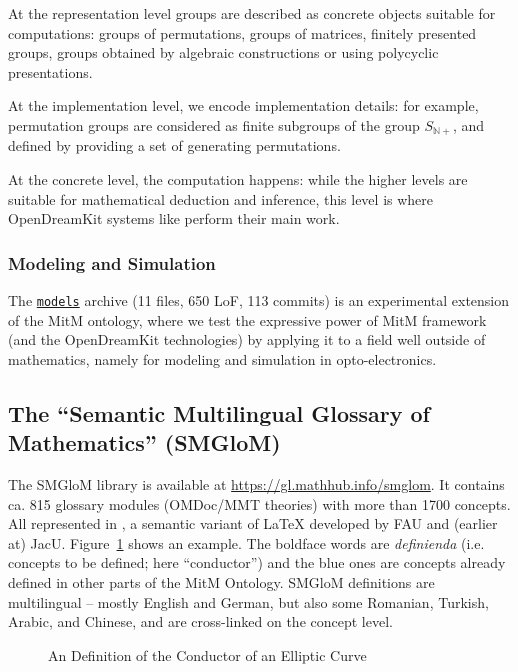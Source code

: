 At the representation level groups are described as concrete objects
suitable for computations: groups of permutations, groups of matrices,
finitely presented groups, groups obtained by algebraic constructions or using
polycyclic presentations.

At the implementation level, we encode implementation details: for
example, permutation groups are considered as finite subgroups of the group $S_{\mathbb{N}+}$, and defined  by
providing a set of generating permutations.

At the concrete level, the computation happens: while the higher levels
are suitable for mathematical deduction and inference, this level is where OpenDreamKit systems like \GAP perform their main work.

\subsubsection{Modeling and Simulation}

The \href{https://gl.mathhub.info/MitM/smglom}{\texttt{models}}
archive (11 files, 650 LoF, 113 commits) is an experimental extension
of the MitM ontology, where we test the expressive power of MitM
framework (and the OpenDreamKit technologies) by applying it to a
field well outside of mathematics, namely for modeling and simulation
in opto-electronics.

\subsection{The ``Semantic Multilingual Glossary of Mathematics'' (SMGloM)}\label{sec:smglom}

The SMGloM library is available at \url{https://gl.mathhub.info/smglom}. It contains
ca. 815 glossary modules (OMDoc/MMT theories) with more than 1700 concepts. All
represented in \sTeX, a semantic variant of {\LaTeX} developed by FAU and (earlier at)
JacU. Figure~\ref{fig:conductor} shows an example. The boldface words are \emph{definienda}
(i.e. concepts to be defined; here ``conductor'') and the blue ones are concepts already
defined in other parts of the MitM Ontology. SMGloM definitions are multilingual -- mostly
English and German, but also some Romanian, Turkish, Arabic, and Chinese, and are
cross-linked on the concept level.


\begin{figure}[ht]\centering
  \caption{An \sTeX Definition of the Conductor of an Elliptic
    Curve}\label{fig:conductor}
\end{figure}


